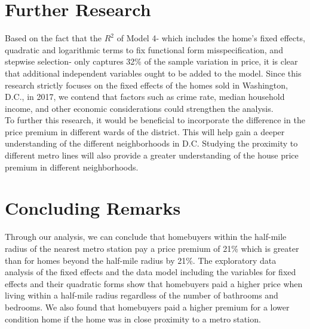\documentclass[12pt]{report}
\newcommand\tab[1][.60cm]{\hspace*{#1}}
\begin{document}
\section*{Further Research}

Based on the fact that the $R^2$ of Model 4- which includes the home's fixed effects, quadratic and logarithmic terms to fix functional form misspecification, and stepwise selection- only captures 32\% of the sample variation in price, it is clear that additional independent variables ought to be added to the model. Since this research strictly focuses on the fixed effects of the homes sold in Washington, D.C., in 2017, we contend that factors such as crime rate, median household income, and other economic considerations could strengthen the analysis. \\
\tab To further this research, it would be beneficial to incorporate the difference in the price premium in different wards of the district. This will help gain a deeper understanding of the different neighborhoods in D.C. Studying the proximity to different metro lines will also provide a greater understanding of the house price premium in different neighborhoods. 

\section*{Concluding Remarks}
Through our analysis, we can conclude that homebuyers within the half-mile radius of the nearest metro station pay a price premium of 21\% which is greater than for homes beyond the half-mile radius by 21\%. The exploratory data analysis of the fixed effects and the data model including the variables for fixed effects and their quadratic forms show that homebuyers paid a higher price when living within a half-mile radius regardless of the number of bathrooms and bedrooms. We also found that homebuyers paid a higher premium for a lower condition home if the home was in close proximity to a metro station. 
\clearpage
\end{document}
